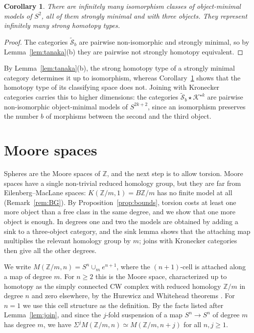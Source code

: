\documentclass[12pt]{amsart}
\newtheorem{corollary}[teo]{Corollary}
\theoremstyle{definition}
\theoremstyle{remark}
\newcommand{\Z}{\mathbb{Z}}
\newcommand{\K}{\mathcal{K}}
\newcommand{\M}{M}
\newcommand{\tSph}{\widetilde{\mathcal{S}}}
\begin{document}
\begin{corollary}\label{cor:infinite}
There are infinitely many isomorphism classes of object-minimal models of $S^2$, all of them strongly minimal and with three objects. They represent infinitely many strong homotopy types.
\end{corollary}

\begin{proof}
The categories $\tSph_b$ are pairwise non-isomorphic and strongly minimal, so by Lemma~\ref{lem:tanaka}(b) they are pairwise not strongly homotopy equivalent.
\end{proof}

By Lemma~\ref{lem:tanaka}(b), the strong homotopy type of a strongly minimal category determines it up to isomorphism, whereas Corollary~\ref{cor:infinite} shows that the homotopy type of its classifying space does not. Joining with Kronecker categories carries this to higher dimensions: the categories $\tSph_b\star\K^{\star k}$ are pairwise non-isomorphic object-minimal models of $S^{2k+2}$, since an isomorphism preserves the number $b$ of morphisms between the second and the third object.

\section{Moore spaces}\label{sec:moore}

Spheres are the Moore spaces of $\Z$, and the next step is to allow torsion. Moore spaces have a single non-trivial reduced homology group, but they are far from Eilenberg--MacLane spaces: $K(\Z/m,1)=B\Z/m$ has no finite model at all (Remark~\ref{rem:BG}). By Proposition~\ref{prop:bounds}, torsion costs at least one more object than a free class in the same degree, and we show that one more object is enough. In degrees one and two the models are obtained by adding a sink to a three-object category, and the sink lemma shows that the attaching map multiplies the relevant homology group by $m$; joins with Kronecker categories then give all the other degrees.

We write $\M(\Z/m,n)=S^n\cup_me^{n+1}$, where the $(n+1)$-cell is attached along a map of degree $m$. For $n\ge2$ this is the Moore space, characterized up to homotopy as the simply connected CW complex with reduced homology $\Z/m$ in degree $n$ and zero elsewhere, by the Hurewicz and Whitehead theorems \cite{Hatcher2002}. For $n=1$ we use this cell structure as the definition. By the facts listed after Lemma~\ref{lem:join}, and since the $j$-fold suspension of a map $S^n\to S^n$ of degree $m$ has degree $m$, we have $\Sigma^j\M(\Z/m,n)\simeq\M(\Z/m,n+j)$ for all $n,j\ge1$.
\end{document}
